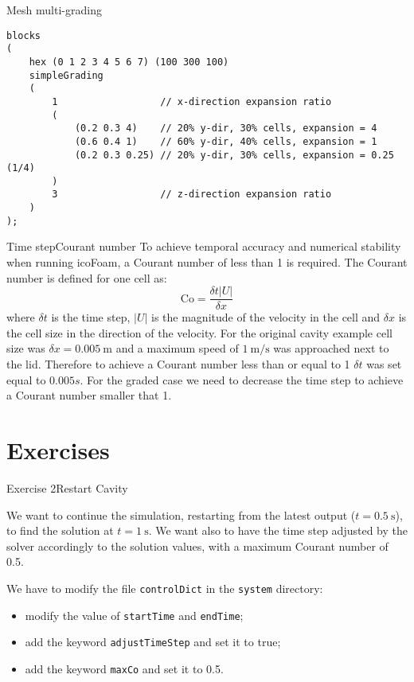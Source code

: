 \documentclass{beamer}
\begin{document}
\begin{frame}[fragile]{Mesh multi-grading}

\begin{scriptsize}
\begin{verbatim}
blocks 
( 
    hex (0 1 2 3 4 5 6 7) (100 300 100) 
    simpleGrading 
    ( 
        1                  // x-direction expansion ratio 
        ( 
            (0.2 0.3 4)    // 20% y-dir, 30% cells, expansion = 4 
            (0.6 0.4 1)    // 60% y-dir, 40% cells, expansion = 1 
            (0.2 0.3 0.25) // 20% y-dir, 30% cells, expansion = 0.25 (1/4) 
        ) 
        3                  // z-direction expansion ratio 
    ) 
);

\end{verbatim}
\end{scriptsize}

\end{frame}


\begin{frame}{Time step}{Courant number}
To achieve temporal accuracy and numerical stability when running icoFoam, a Courant number of less than 1 is required. The Courant number is defined for one cell as:
\[
\mathrm{Co} = \frac{\delta t |U|}{\delta x}
\]
where $\delta t$ is the time step, $|U|$ is the magnitude of the velocity in the cell and $\delta x$ is the cell size in the direction of the velocity. 
For the original cavity example cell size was $\delta x =\SI{0.005}{\m}$ and a maximum speed of $\SI{1}{\m/\s}$ was approached next to the lid. Therefore to achieve a Courant number less than or equal to 1 $\delta t$ was set equal to $0.005s$. For the graded case we need to decrease the time step to achieve a Courant number smaller that 1. 

\end{frame}

\section{Exercises}

\begin{frame}{Exercise 2}{Restart Cavity}

We want to continue the simulation, restarting from the latest output ($t=\SI{0.5}{\s}$), to find the solution at $t=\SI{1}{\s}$. We want also to have the time step adjusted by the solver accordingly to the solution values, with a maximum Courant number of 0.5.

We have to modify the file \texttt{controlDict} in the \texttt{system} directory:

\begin{itemize}
\item modify the value of \texttt{startTime} and \texttt{endTime};
\item add the keyword \texttt{adjustTimeStep} and set it to true;
\item add the keyword \texttt{maxCo} and set it to 0.5.
\end{itemize}

\end{frame}
\end{document}
